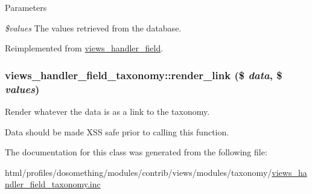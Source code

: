 \begin{DoxyParams}{Parameters}
\item[{\em \$values}]The values retrieved from the database. \end{DoxyParams}


Reimplemented from \hyperlink{classviews__handler__field_a82ff951c5e9ceb97b2eab86f880cbc1e}{views\_\-handler\_\-field}.\hypertarget{classviews__handler__field__taxonomy_aeeaf9833824a87e8fe2717880dc389af}{
\subsubsection[{render\_\-link}]{\setlength{\rightskip}{0pt plus 5cm}views\_\-handler\_\-field\_\-taxonomy::render\_\-link (\$ {\em data}, \/  \$ {\em values})}}
\label{classviews__handler__field__taxonomy_aeeaf9833824a87e8fe2717880dc389af}
Render whatever the data is as a link to the taxonomy.

Data should be made XSS safe prior to calling this function. 

The documentation for this class was generated from the following file:\begin{DoxyCompactItemize}
\item 
html/profiles/dosomething/modules/contrib/views/modules/taxonomy/\hyperlink{views__handler__field__taxonomy_8inc}{views\_\-handler\_\-field\_\-taxonomy.inc}\end{DoxyCompactItemize}
